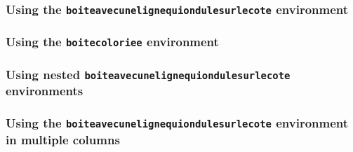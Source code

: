 \documentclass[a4paper,10pt]{article}
\begin{document}
\subsubsection*{Using the \texttt{boiteavecunelignequiondulesurlecote} environment}

\begin{boiteavecunelignequiondulesurlecote}
  \lipsum[1-3]
\end{boiteavecunelignequiondulesurlecote}

\subsubsection*{Using the \texttt{boitecoloriee} environment}

\bkcounttrue
\begin{boitecoloriee}
  \lipsum[1-3]
\end{boitecoloriee}

\subsubsection*{Using nested \texttt{boiteavecunelignequiondulesurlecote} environments}

\bkcountfalse
\begin{boiteavecunelignequiondulesurlecote} 
  \lipsum[1]\bigskip
  \begin{boiteavecunelignequiondulesurlecote} 
    \lipsum[2]\bigskip
    \begin{boiteavecunelignequiondulesurlecote} 
      \lipsum[3]\bigskip
    \end{boiteavecunelignequiondulesurlecote}
    \lipsum[4]
  \end{boiteavecunelignequiondulesurlecote}
  \lipsum[5]
\end{boiteavecunelignequiondulesurlecote}

\subsubsection*{Using the \texttt{boiteavecunelignequiondulesurlecote} environment in multiple columns}

\bkcountfalse
\begin{multicols}{3}
  \lipsum[1]
  \begin{boiteavecunelignequiondulesurlecote} 
    \lipsum[2-4]
  \end{boiteavecunelignequiondulesurlecote}
  \lipsum[5]
  \begin{boiteavecunelignequiondulesurlecote} 
    \lipsum[6-8]
  \end{boiteavecunelignequiondulesurlecote}
  \lipsum[9-14]
\end{multicols}
\end{document}
